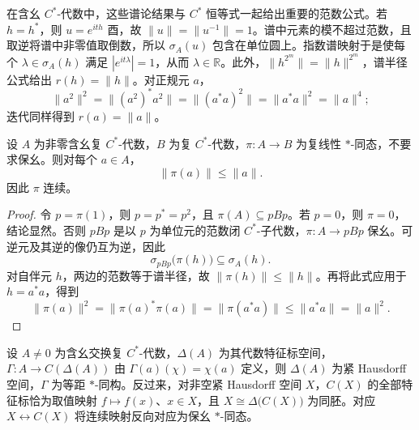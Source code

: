 在含幺 \(C^*\)-代数中，这些谱论结果与 \(C^*\) 恒等式一起给出重要的范数公式。若 \(h=h^*\)，则 \(u=e^{ith}\) 酉，故 \(\|u\|=\|u^{-1}\|=1\)。谱中元素的模不超过范数，且取逆将谱中非零值取倒数，所以 \(\sigma_A(u)\) 包含在单位圆上。指数谱映射于是使每个 \(\lambda\in\sigma_A(h)\) 满足 \(|e^{it\lambda}|=1\)，从而 \(\lambda\in\mathbb R\)。此外，\(\|h^{2^m}\|=\|h\|^{2^m}\)，谱半径公式给出 \(r(h)=\|h\|\)。对正规元 \(a\)，
\[
	\|a^2\|^2=\|(a^2)^*a^2\|=\|(a^*a)^2\|=\|a^*a\|^2=\|a\|^4;
\]
迭代同样得到 \(r(a)=\|a\|\)。

\begin{proposition}[含幺定义域上的自动收缩性]\label{b2:prop:cstar-star-hom-contractivity-unital}
	设 \(A\) 为非零含幺复 \(C^*\)-代数，\(B\) 为复 \(C^*\)-代数，\(\pi:A\to B\) 为复线性 \(*\)-同态，不要求保幺。则对每个 \(a\in A\)，
	\[
		\|\pi(a)\|\le\|a\|.
	\]
	因此 \(\pi\) 连续。
\end{proposition}

\begin{proof}
	令 \(p=\pi(1)\)，则 \(p=p^*=p^2\)，且 \(\pi(A)\subseteq pBp\)。若 \(p=0\)，则 \(\pi=0\)，结论显然。否则 \(pBp\) 是以 \(p\) 为单位元的范数闭 \(C^*\)-子代数，\(\pi:A\to pBp\) 保幺。可逆元及其逆的像仍互为逆，因此
	\[
		\sigma_{pBp}\bigl(\pi(h)\bigr)\subseteq\sigma_A(h).
	\]
	对自伴元 \(h\)，两边的范数等于谱半径，故 \(\|\pi(h)\|\le\|h\|\)。再将此式应用于 \(h=a^*a\)，得到
	\[
		\|\pi(a)\|^2=\|\pi(a)^*\pi(a)\|=\|\pi(a^*a)\|\le\|a^*a\|=\|a\|^2.
	\]
\end{proof}

\begin{theorem}[Gelfand 对偶]\label{b2:thm:gelfand-duality-external}
	设 \(A\ne0\) 为含幺交换复 \(C^*\)-代数，\(\Delta(A)\) 为其代数特征标空间，\(\Gamma:A\rightarrow C(\Delta(A))\) 由 \(\Gamma(a)(\chi)=\chi(a)\) 定义，则 \(\Delta(A)\) 为紧 Hausdorff 空间，\(\Gamma\) 为等距 \(*\)-同构。反过来，对非空紧 Hausdorff 空间 \(X\)，\(C(X)\) 的全部特征标恰为取值映射 \(f\mapsto f(x)\)、\(x\in X\)，且 \(X\cong\Delta\bigl(C(X)\bigr)\) 为同胚。对应 \(X\leftrightarrow C(X)\) 将连续映射反向对应为保幺 \(*\)-同态。
\end{theorem}

